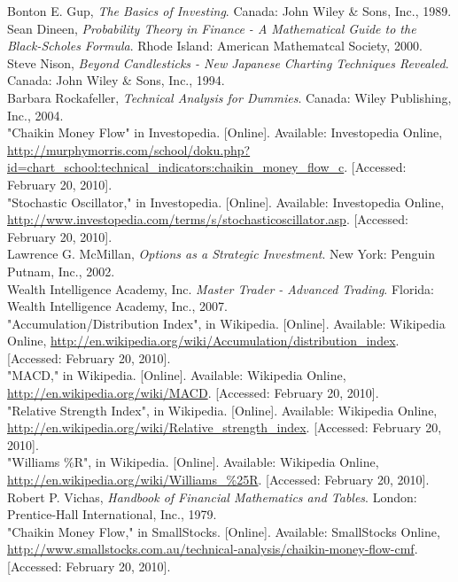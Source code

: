 \begin{thebibliography}{9999}%
 Bonton E. Gup, \textsl{The Basics of Investing}. Canada: John Wiley \& Sons, Inc., 1989.\\
 Sean Dineen, \textsl{Probability Theory in Finance - A Mathematical Guide to the Black-Scholes Formula}. Rhode Island: American Mathematcal Society, 2000.\\
 Steve Nison, \textsl{Beyond Candlesticks - New Japanese Charting Techniques Revealed}. Canada: John Wiley \& Sons, Inc., 1994.\\
 Barbara Rockafeller, \textsl{Technical Analysis for Dummies}. Canada: Wiley Publishing, Inc., 2004.\\
 "Chaikin Money Flow" in Investopedia. [Online]. Available: Investopedia Online, \mbox{}\hfill\url{http://murphymorris.com/school/doku.php?id=chart_school:technical_indicators:chaikin_money_flow_c}. [Accessed: February 20, 2010].\\
 "Stochastic Oscillator," in Investopedia. [Online]. Available: Investopedia Online, \mbox{}\hfill\url{http://www.investopedia.com/terms/s/stochasticoscillator.asp}. [Accessed: February 20, 2010].\\
 Lawrence G. McMillan, \textsl{Options as a Strategic Investment}. New York: Penguin Putnam, Inc., 2002.\\
 Wealth Intelligence Academy, Inc. \textsl{Master Trader - Advanced Trading}. Florida: Wealth Intelligence Academy, Inc., 2007.\\
 "Accumulation/Distribution Index", in Wikipedia. [Online]. Available: Wikipedia Online, \mbox{}\hfill\url{http://en.wikipedia.org/wiki/Accumulation/distribution_index}. [Accessed: February 20, 2010].\\
 "MACD," in Wikipedia. [Online]. Available: Wikipedia Online, \mbox{}\hfill\url{http://en.wikipedia.org/wiki/MACD}. [Accessed: February 20, 2010].\\
 "Relative Strength Index", in Wikipedia. [Online]. Available: Wikipedia Online, \mbox{}\hfill\url{http://en.wikipedia.org/wiki/Relative_strength_index}. [Accessed: February 20, 2010].\\
 "Williams \%R", in Wikipedia. [Online]. Available: Wikipedia Online, \mbox{}\hfill\url{http://en.wikipedia.org/wiki/Williams_\%25R}. [Accessed: February 20, 2010].\\
 Robert P. Vichas, \textsl{Handbook of Financial Mathematics and Tables}. London: Prentice-Hall International, Inc., 1979.\\
 "Chaikin Money Flow," in SmallStocks. [Online]. Available: SmallStocks Online, \mbox{}\hfill\url{http://www.smallstocks.com.au/technical-analysis/chaikin-money-flow-cmf}. [Accessed: February 20, 2010].\\
\end{thebibliography}







